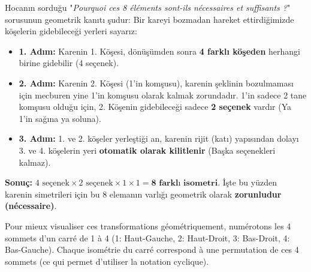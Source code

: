 \documentclass[12pt,a4paper]{report}
\begin{document}
\begin{tcolorbox}[colback=orange!5!white,colframe=orange!80!black,title=Pourquoi exactement 8 symétries ? (Preuve Géométrique)]
Hocanın sorduğu "\textit{Pourquoi ces 8 éléments sont-ils nécessaires et suffisants ?}" sorusunun geometrik kanıtı şudur:
Bir kareyi bozmadan hareket ettirdiğimizde köşelerin gidebileceği yerleri sayarız:
\begin{itemize}
    \item \textbf{1. Adım:} Karenin 1. Köşesi, dönüşümden sonra \textbf{4 farklı köşeden} herhangi birine gidebilir (4 seçenek).
    \item \textbf{2. Adım:} Karenin 2. Köşesi (1'in komşusu), karenin şeklinin bozulmaması için mecburen yine 1'in komşusu olarak kalmak zorundadır. 1'in sadece 2 tane komşusu olduğu için, 2. Köşenin gidebileceği sadece \textbf{2 seçenek} vardır (Ya 1'in sağına ya soluna).
    \item \textbf{3. Adım:} 1. ve 2. köşeler yerleştiği an, karenin rijit (katı) yapısından dolayı 3. ve 4. köşelerin yeri \textbf{otomatik olarak kilitlenir} (Başka seçenekleri kalmaz).
\end{itemize}
\textbf{Sonuç:} $4 \text{ seçenek} \times 2 \text{ seçenek} \times 1 \times 1 = \mathbf{8 \text{ farklı isometri}}$. 
İşte bu yüzden karenin simetrileri için bu 8 elemanın varlığı geometrik olarak \textbf{zorunludur (nécessaire)}.
\end{tcolorbox}

Pour mieux visualiser ces transformations géométriquement, numérotons les 4 sommets d'un carré de 1 à 4 (1: Haut-Gauche, 2: Haut-Droit, 3: Bas-Droit, 4: Bas-Gauche). 
Chaque isométrie du carré correspond à une permutation de ces 4 sommets (ce qui permet d'utiliser la notation cyclique).
\end{document}
